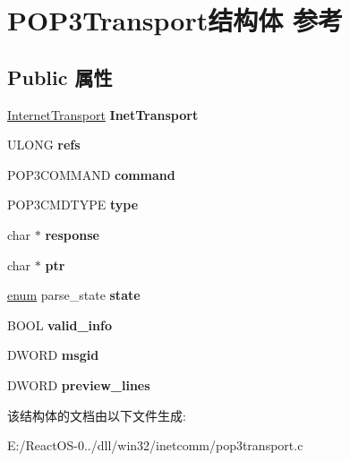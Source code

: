 \hypertarget{struct_p_o_p3_transport}{}\section{P\+O\+P3\+Transport结构体 参考}
\label{struct_p_o_p3_transport}
\subsection*{Public 属性}
\begin{DoxyCompactItemize}
\item 
\mbox{\label{struct_p_o_p3_transport_ad6230f7bc041829c40a086952a157e5d}} 
\hyperlink{struct_internet_transport}{Internet\+Transport} {\bfseries Inet\+Transport}
\item 
\mbox{\label{struct_p_o_p3_transport_ade9827f263511120707b82a4aa2fc35f}} 
U\+L\+O\+NG {\bfseries refs}
\item 
\mbox{\label{struct_p_o_p3_transport_a76ec227e55ca7839c94e39942b3db8da}} 
P\+O\+P3\+C\+O\+M\+M\+A\+ND {\bfseries command}
\item 
\mbox{\label{struct_p_o_p3_transport_a7fb3d2625b1fe022766da56fca9ca784}} 
P\+O\+P3\+C\+M\+D\+T\+Y\+PE {\bfseries type}
\item 
\mbox{\label{struct_p_o_p3_transport_a4eeab4ac23d8658f5e675f79b4153bbd}} 
char $\ast$ {\bfseries response}
\item 
\mbox{\label{struct_p_o_p3_transport_a23df0718757d05761646dfe9ac2e3dff}} 
char $\ast$ {\bfseries ptr}
\item 
\mbox{\label{struct_p_o_p3_transport_a228b9144484f19b24377208dc13b87b8}} 
\hyperlink{interfaceenum}{enum} parse\+\_\+state {\bfseries state}
\item 
\mbox{\label{struct_p_o_p3_transport_aa417e04109c84af2177bec3517fde261}} 
B\+O\+OL {\bfseries valid\+\_\+info}
\item 
\mbox{\label{struct_p_o_p3_transport_af802cb55c098c28a92b4bad2132882e6}} 
D\+W\+O\+RD {\bfseries msgid}
\item 
\mbox{\label{struct_p_o_p3_transport_a748b8a14f9ea209673267f249a9d93ee}} 
D\+W\+O\+RD {\bfseries preview\+\_\+lines}
\end{DoxyCompactItemize}


该结构体的文档由以下文件生成\+:\begin{DoxyCompactItemize}
\item 
E\+:/\+React\+O\+S-\/0../dll/win32/inetcomm/pop3transport.\+c\end{DoxyCompactItemize}
